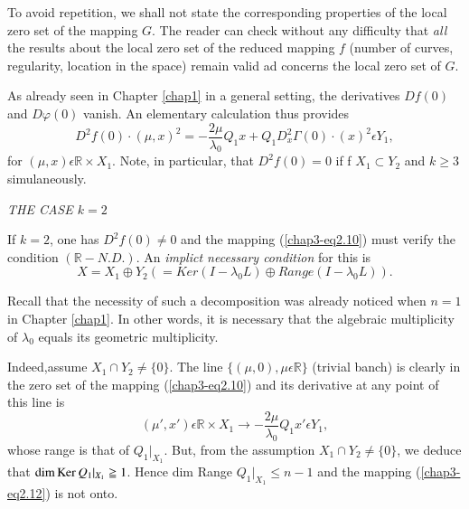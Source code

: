 \begin{remark}\label{chap3-rem2.1}
To avoid repetition, we shall not state the corresponding properties
of the local zero set of the mapping $G$. The reader can check without
any difficulty that {\em all} the results about the local zero set of
the reduced mapping $f$ (number of curves, regularity, location in the
space) remain valid ad concerns the local zero set of $G$.
\end{remark}

As already seen in Chapter \ref{chap1} in a general setting, the
derivatives $Df(0)$ and $D\varphi(0)$ vanish. An elementary
calculation thus provides
\begin{equation*}
D^{2}f(0) \cdot (\mu, x)^{2} = - \frac{2\mu}{\lambda_{0}} Q_{1}x +
Q_{1}D_{x}^{2}\Gamma(0) \cdot (x)^{2} \epsilon Y_{1},\tag{2.10}\label{chap3-eq2.10}
\end{equation*}
for $(\mu, x) \epsilon \mathbb{R} \times X_{1}$. Note, in particular,
that $D^{2}f(0) = 0$ if f $X_{1} \subset Y_{2}$ and $k \geq 3$
simulaneously.

\begin{center}
{\em THE CASE $k = 2$}
\end{center}

If $k = 2$, one has $D^{2}f(0) \neq 0$ and the mapping
(\ref{chap3-eq2.10}) must verify the condition $(\mathbb{R}-N.D.)$. An
{\em implict necessary condition} for this is
\begin{equation*}
X = X_{1} \oplus Y_{2} (=Ker (I - \lambda_{0}L) \oplus Range (I - \lambda_{0}L)).\tag{2.11}\label{chap3-eq2.11}
\end{equation*}

Recall that the necessity of such a decomposition was already noticed
when $n = 1$ in Chapter \ref{chap1}. In other words, it is necessary
that the algebraic multiplicity of $\lambda_{0}$ equals its geometric
multiplicity.

Indeed,\pageoriginale assume $X_{1} \cap Y_{2} \neq \{0\}$. The line
$\{(\mu, 0), \mu \epsilon \mathbb{R}\}$ (trivial banch) is clearly in
the zero set of the mapping (\ref{chap3-eq2.10}) and its derivative at
any point of this line is
\begin{equation*}
(\mu', x') \epsilon \mathbb{R} \times X_{1} \to -
  \frac{2\mu}{\lambda_{0}} Q_{1}x' \epsilon Y_{1},\tag{2.12}\label{chap3-eq2.12}
\end{equation*}
whose range is that of $Q_{1} |_{X_{1}}$. But, from the assumption
$X_{1} \cap Y_{2} \neq \{0\}$, we deduce that $\dim \operatorname{Ker} Q_{1}|_{X_{1}}
\geqq 1$. Hence dim Range $Q_{1} |_{X_{1}} \leq n - 1$ and the mapping
(\ref{chap3-eq2.12}) is not onto.

